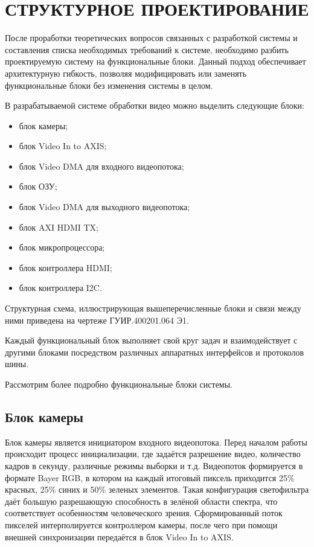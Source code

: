 \section{СТРУКТУРНОЕ ПРОЕКТИРОВАНИЕ}
\label{sec:structural}

После проработки теоретических вопросов связанных с разработкой системы и
составления списка необходимых требований к системе, необходимо разбить проектируемую систему
на функциональные блоки. Данный подход обеспечивает архитектурную гибкость, позволяя
модифицировать или заменять функциональные блоки без изменения системы в целом.

В разрабатываемой системе обработки видео можно выделить следующие блоки:

\begin{itemize}
  \item блок камеры;
  \item блок Video In to AXIS;
  \item блок Video DMA для входного видеопотока;
  \item блок ОЗУ;
  \item блок Video DMA для выходного видеопотока;
  \item блок AXI HDMI TX;
  \item блок микропроцессора;
  \item блок контроллера HDMI;
  \item блок контроллера I2C.
\end{itemize}

Структурная схема, иллюстрирующая вышеперечисленные блоки и связи
между ними приведена на чертеже ГУИР.400201.064 Э1.

Каждый функциональный блок выполняет свой круг задач и взаимодействует с другими блоками
посредством различных аппаратных интерфейсов и протоколов шины.

Рассмотрим более подробно функциональные блоки системы.

\subsection{Блок камеры}
\label{sec:structural:camera}

Блок камеры является инициатором входного видеопотока. Перед началом работы происходит
процесс инициализации, где задаётся разрешение видео, количество кадров в секунду,
различные режимы выборки и т.д. Видеопоток формируется в формате Bayer RGB, в котором
на каждый итоговый пиксель приходится 25\% красных, 25\% синих и 50\% зеленых элементов.
Такая конфигурация светофильтра даёт большую разрешающую способность в зелёной области спектра,
что соответствует особенностям человеческого зрения. Сформированный поток пикселей интерполируется
контроллером камеры, после чего при помощи внешней синхронизации передаётся в блок Video In to AXIS.

